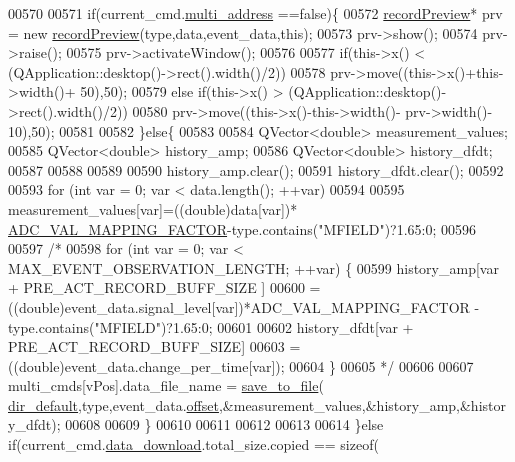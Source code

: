 \begin{DoxyCode}
00570 
00571         \textcolor{keywordflow}{if}(current\_cmd.\hyperlink{a00004_a8e69b971c61ced27a7567efd2bf0db59}{multi\_address} ==\textcolor{keyword}{false})\{
00572         \hyperlink{a00073}{recordPreview}* prv = \textcolor{keyword}{new} \hyperlink{a00073}{recordPreview}(type,data,event\_data,\textcolor{keyword}{this});
00573         prv->show();
00574         prv->raise();
00575         prv->activateWindow();
00576 
00577         \textcolor{keywordflow}{if}(this->x() < (QApplication::desktop()->rect().width()/2))
00578         prv->move((this->x()+this->width()+ 50),50);
00579         \textcolor{keywordflow}{else} \textcolor{keywordflow}{if}(this->x() > (QApplication::desktop()->rect().width()/2))
00580         prv->move((this->x()-this->width()- prv->width()- 10),50);
00581 
00582         \}\textcolor{keywordflow}{else}\{
00583 
00584             QVector<double> measurement\_values;
00585             QVector<double> history\_amp;
00586             QVector<double> history\_dfdt;
00587 
00588 
00589 
00590             history\_amp.clear();
00591             history\_dfdt.clear();
00592 
00593             \textcolor{keywordflow}{for} (\textcolor{keywordtype}{int} var = 0; var < data.length(); ++var)
00594 
00595                 measurement\_values[var]=((\textcolor{keywordtype}{double})data[var])*
      \hyperlink{a00086_ada92d3eeeec0cbeee41e76a52d145792}{ADC\_VAL\_MAPPING\_FACTOR}-type.contains(\textcolor{stringliteral}{"MFIELD"})?1.65:0;
00596 
00597 \textcolor{comment}{/*}
00598 \textcolor{comment}{            for (int var = 0; var < MAX\_EVENT\_OBSERVATION\_LENGTH; ++var) \{}
00599 \textcolor{comment}{                history\_amp[var + PRE\_ACT\_RECORD\_BUFF\_SIZE ]}
00600 \textcolor{comment}{                        =((double)event\_data.signal\_level[var])*ADC\_VAL\_MAPPING\_FACTOR -
       type.contains("MFIELD")?1.65:0;}
00601 \textcolor{comment}{}
00602 \textcolor{comment}{                history\_dfdt[var + PRE\_ACT\_RECORD\_BUFF\_SIZE]}
00603 \textcolor{comment}{                        =((double)event\_data.change\_per\_time[var]);}
00604 \textcolor{comment}{            \}}
00605 \textcolor{comment}{*/}
00606 
00607            multi\_cmds[vPos].data\_file\_name =  \hyperlink{a00017_a0114355b9f626345cf77d6f714f51468}{save\_to\_file}(
      \hyperlink{a00017_a2e107e43aeaccaf4c9a42254f13122c8}{dir\_default},type,event\_data.\hyperlink{a00006_a90588fed720ad404c18bcbb8fa84878e}{offset},&measurement\_values,&history\_amp,&history\_dfdt);
00608 
00609         \}
00610 
00611    
00612 
00613 
00614     \}\textcolor{keywordflow}{else} \textcolor{keywordflow}{if}(current\_cmd.\hyperlink{a00004_a5cfeaed4d4f8e51070a324c0ba893ebe}{data\_download}.total\_size.copied == \textcolor{keyword}{sizeof}(

\end{DoxyCode}
